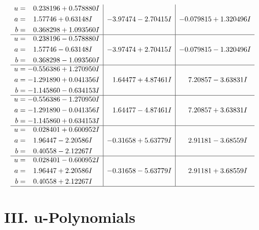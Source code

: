 \documentclass[1p]{elsarticle_modified}
\theoremstyle{definition}
\begin{document}
$$\begin{array}{c|c|c}
\begin{aligned}
u &= \phantom{-}0.238196 + 0.578880 I \\
a &= \phantom{-}1.57746 + 0.63148 I \\
b &= \phantom{-}0.368298 + 1.093560 I\end{aligned}
 & -3.97474 - 2.70415 I & -0.079815 + 1.320496 I \\ \hline\begin{aligned}
u &= \phantom{-}0.238196 - 0.578880 I \\
a &= \phantom{-}1.57746 - 0.63148 I \\
b &= \phantom{-}0.368298 - 1.093560 I\end{aligned}
 & -3.97474 + 2.70415 I & -0.079815 - 1.320496 I \\ \hline\begin{aligned}
u &= -0.556386 + 1.270950 I \\
a &= -1.291890 + 0.041356 I \\
b &= -1.145860 - 0.634153 I\end{aligned}
 & \phantom{-}1.64477 + 4.87461 I & \phantom{-}7.20857 - 3.63831 I \\ \hline\begin{aligned}
u &= -0.556386 - 1.270950 I \\
a &= -1.291890 - 0.041356 I \\
b &= -1.145860 + 0.634153 I\end{aligned}
 & \phantom{-}1.64477 - 4.87461 I & \phantom{-}7.20857 + 3.63831 I \\ \hline\begin{aligned}
u &= \phantom{-}0.028401 + 0.600952 I \\
a &= \phantom{-}1.96447 - 2.20586 I \\
b &= \phantom{-}0.40558 - 2.12267 I\end{aligned}
 & -0.31658 + 5.63779 I & \phantom{-}2.91181 - 3.68559 I \\ \hline\begin{aligned}
u &= \phantom{-}0.028401 - 0.600952 I \\
a &= \phantom{-}1.96447 + 2.20586 I \\
b &= \phantom{-}0.40558 + 2.12267 I\end{aligned}
 & -0.31658 - 5.63779 I & \phantom{-}2.91181 + 3.68559 I\\
 \hline 
 \end{array}$$\newpage
\newpage\renewcommand{\arraystretch}{1}
\centering \section*{ III. u-Polynomials}
\end{document}
